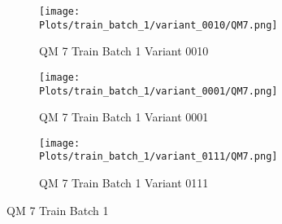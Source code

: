 \documentclass{DissertateFigs}
\begin{document}
\begin{figure}[t!]
\medskip

    \begin{subfigure}{0.47\textwidth}
    \texttt{[image: Plots/train\_batch\_1/variant\_0010/QM7.png]}
    \caption{QM 7 Train Batch 1 Variant 0010}
    \end{subfigure}
    \begin{subfigure}{0.47\textwidth}
    \texttt{[image: Plots/train\_batch\_1/variant\_0001/QM7.png]}
    \caption{QM 7 Train Batch 1 Variant 0001}
    \end{subfigure}

\medskip

    \begin{subfigure}{0.47\textwidth}
    \texttt{[image: Plots/train\_batch\_1/variant\_0111/QM7.png]}
    \caption{QM 7 Train Batch 1 Variant 0111}
    \end{subfigure}
\caption{QM 7 Train Batch 1}
    \end{figure}
\clearpage
\end{document}
